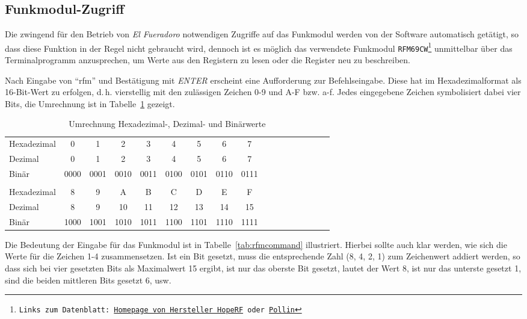 \documentclass[pdftex, parskip, numbers=noenddot, toc=listof]{scrbook}
\newcommand{\anlage}{\emph{El Fueradoro}}
\begin{document}
	\subsection{Funkmodul-Zugriff}
	\label{sec:rfmzugriff}

	Die zwingend für den Betrieb von {\anlage} notwendigen Zugriffe auf das Funkmodul werden von der Software automatisch getätigt, so dass diese Funktion in der Regel nicht gebraucht wird, dennoch ist es möglich das verwendete Funkmodul \texttt{RFM69CW\footnote{Links zum Datenblatt: \href{http://www.hoperf.com/upload/rf/RFM69CW-V1.1.pdf}{Homepage von Hersteller HopeRF} oder \href{http://www.pollin.de/shop/downloads/D810303D.PDF}{Pollin}}} unmittelbar über das Terminalprogramm anzusprechen, um Werte aus den Registern zu lesen oder die Register neu zu beschreiben.

	Nach Eingabe von \enquote{rfm} und Bestätigung mit \emph{ENTER} erscheint eine Aufforderung zur Befehlseingabe. Diese hat im Hexadezimalformat als 16-Bit-Wert zu erfolgen, d.\,h. vierstellig mit den zulässigen Zeichen 0-9 und A-F bzw. a-f. Jedes eingegebene Zeichen symbolisiert dabei vier Bits, die Umrechnung ist in Tabelle~\ref{tab:zahlensysteme} gezeigt.

	\begin{table}[t]
		\begin{center}
			\begin{tabularx}{.8\textwidth}{X*{16}c}
				\hline\hline
				Hexadezimal & 0    & 1    & 2    & 3    & 4    & 5    & 6    & 7    \\
				Dezimal     & 0    & 1    & 2    & 3    & 4    & 5    & 6    & 7    \\
				Binär      & 0000 & 0001 & 0010 & 0011 & 0100 & 0101 & 0110 & 0111 \\
				\\
				Hexadezimal & 8    & 9    & A    & B    & C    & D    & E    & F    \\
				Dezimal     & 8    & 9    & 10   & 11   & 12   & 13   & 14   & 15   \\
				Binär      & 1000 & 1001 & 1010 & 1011 & 1100 & 1101 & 1110 & 1111 \\ \hline\hline
			\end{tabularx}
		\end{center}
		\caption{Umrechnung Hexadezimal-, Dezimal- und Binärwerte}
		\label{tab:zahlensysteme}
	\end{table}

	Die Bedeutung der Eingabe für das Funkmodul ist in Tabelle~\ref{tab:rfmcommand} illustriert. Hierbei sollte auch klar werden, wie sich die Werte für die Zeichen 1-4 zusammensetzen. Ist ein Bit gesetzt, muss die entsprechende Zahl (8, 4, 2, 1) zum Zeichenwert addiert werden, so dass sich bei vier gesetzten Bits als Maximalwert 15 ergibt, ist nur das oberste Bit gesetzt, lautet der Wert 8, ist nur das unterste gesetzt 1, sind die beiden mittleren Bits gesetzt 6, usw.
\end{document}
